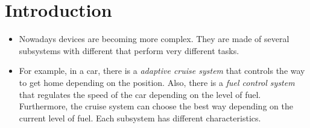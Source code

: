 \chapter{Introduction}


\begin{itemize}
	\item Nowadays devices are becoming more complex. They are made of several subsystems with different that perform very different tasks. 
	
	\item For example, in a car, there is a \emph{adaptive cruise system} that controls the way to get home depending on the position. Also, there is a \emph{fuel control system} that regulates the speed of the car depending on the level of fuel. Furthermore, the cruise system can choose the best way depending on the current level of fuel. Each subsystem has different characteristics. 
	
	
	
	
	
	

\end{itemize}
